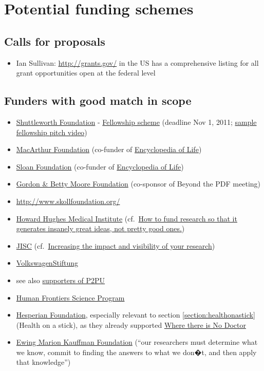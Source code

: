 \documentclass[final,authoryear,3p]{elsarticle-open-drafting}
\begin{document}
\section{Potential funding schemes}
\subsection{Calls for proposals}
\begin{itemize}
	\item Ian Sullivan: \href{http://grants.gov/}{http://grants.gov/}  in the US has a comprehensive listing for all grant opportunities open at the federal level
\end{itemize}
\subsection{Funders with good match in scope}
\begin{itemize}
	\item \href{http://www.shuttleworthfoundation.org/}{Shuttleworth Foundation} - \href{http://www.shuttleworthfoundation.org/funding/fellowship-programme/}{Fellowship scheme} (deadline Nov 1, 2011; \href{http://vimeo.com/10401282}{sample fellowship pitch video})
	\item \href{http://www.macfound.org}{MacArthur Foundation} (co-funder of \href{http://www.eol.org/}{Encyclopedia of Life})
	\item \href{http://www.sloan.org/}{Sloan Foundation} (co-funder of \href{http://www.eol.org/}{Encyclopedia of Life})
	\item \href{http://www.moore.org/}{Gordon \& Betty Moore Foundation} (co-sponsor of Beyond the PDF meeting)
	\item \href{http://www.skollfoundation.org/}{http://www.skollfoundation.org/}
	\item \href{http://www.hhmi.org/}{Howard Hughes Medical Institute} (cf.\ \href{http://www.slate.com/id/2293699/pagenum/all/#p2}{How to fund research so that it generates insanely great ideas, not pretty good ones.})
	\item \href{http://www.jisc.ac.uk}{JISC} (cf.\  \href{http://www.jisc.ac.uk/supportingyourinstitution/researchexcellence/researchvisibility.aspx}{Increasing the impact and visibility of your research})
	\item \href{http://www.volkswagen-stiftung.de/}{VolkswagenStiftung}
	\item see also \href{http://p2pu.org/general/supporters}{supporters of P2PU}
	\item \href{http://www.hfsp.org/}{Human Frontiers Science Program}
	\item \href{http://www.hesperian.org/publications_download.php}{Hesperian Foundation}, especially relevant to section \ref{section:healthonastick} (Health on a stick), as they already supported \href{http://site.ebrary.com/lib/hesperian/docDetail.action?docID=10411911}{Where there is No Doctor}
	\item \href{http://www.kauffman.org/about-foundation/foundation-overview.aspx}{Ewing Marion Kauffman Foundation} (``our researchers must determine what we know, commit to finding the answers to what we don�t, and then apply that knowledge'')
\end{itemize}
\end{document}
